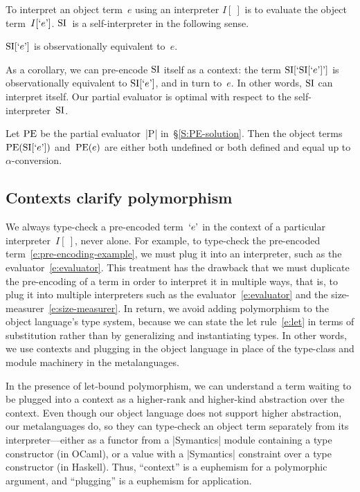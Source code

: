 To interpret an object term~$e$ using an interpreter $I[~]$ is to
evaluate the object term~$I[\encode{e}]$.  $\si$~is
a self\hyp interpreter in the following sense.
\begin{proposition}
    $\si[\encode{e}]$ is observationally equivalent to~$e$.
\end{proposition}
As a corollary, we can pre-encode $\si$ itself as
a context: the term $\si[\encode{\si[\encode{e}]}]$ is observationally
equivalent to $\si[\encode{e}]$, and in turn to~$e$.  In other words,
$\si$ can interpret itself.  Our partial evaluator is optimal with respect to
the self\hyp interpreter~$\si$.
\begin{proposition}
    Let $\pe$ be the partial evaluator~|P| in~\S\ref{S:PE-solution}.
    Then the object terms $\pe(\si[\encode{e}])$ and~$\pe(e)$ are
    either both undefined or both defined and
    equal up to $\alpha$\hyp conversion.
\end{proposition}

\subsection{Contexts clarify polymorphism}
\label{S:clarify}

We always type-check a pre-encoded term~$\encode{e}$ in the context of
a particular interpreter~$I[~]$, never alone.  For example, to
type-check the pre-encoded term~\eqref{e:pre-encoding-example}, we must
plug it into an interpreter, such as the evaluator~\eqref{e:evaluator}.
This treatment has the drawback that we must duplicate the pre-encoding
of a term in order to interpret it in multiple ways, that is, to plug it
into multiple interpreters such as the evaluator~\eqref{e:evaluator} and
the size\hyp measurer~\eqref{e:size-measurer}.  In return, we avoid
adding polymorphism to the object language's type system, because we can
state the let rule~\eqref{e:let} in terms of substitution rather than by
generalizing and instantiating types.  In other words, we use contexts
and plugging in the object language in place of the type-class and
module machinery in the metalanguages.

In the presence of let-bound polymorphism, we can understand a term
waiting to be plugged into a context as a higher-rank and higher-kind
abstraction over the context.  Even though our object language does not support
higher abstraction, our metalanguages do, so they can type-check an object term
separately from its interpreter---either as a functor from a |Symantics| module
containing a type constructor
(in OCaml), or a value with a |Symantics| constraint over a type
constructor (in Haskell).  Thus,
``context'' is a euphemism for a polymorphic argument, and ``plugging''
is a euphemism for application.

